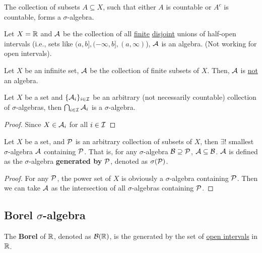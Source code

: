 \documentclass[11pt]{article}
\begin{document}
	\begin{example}
		The collection of subsets $A \subseteq X$, such that either $A$ is countable or $A^c$ is countable, forms a $\sigma$-algebra.
	\end{example}
	
	\begin{example}
		Let $X = \mathbb{R}$ and $\mathcal{{A}}$ be the collection of all \ul{finite} \ul{disjoint} unions of half-open intervals (i.e., sets like $(a, b], (-\infty, b], (a, \infty)$), $\mathcal{{A}}$ is an algebra. (Not working for open intervals).
	\end{example}
	
	\begin{example}
		Let $X$ be an infinite set, $\mathcal{{A}}$ be the collection of finite subsets of $X$. Then, $\mathcal{{A}}$ is \ul{not} an algebra.
	\end{example}
	
	\begin{proposition}
		Let $X$ be a set and $\{\mathcal{{A}}_i\}_{i \in \mathcal{{I}}}$ be an arbitrary (not necessarily countable) collection of $\sigma$-algebras, then $\bigcap_{i \in \mathcal{{I}}} \mathcal{{A}}_i$ is a $\sigma$-algebra.
		\begin{proof}
			Since $X \in \mathcal{{A}}_i$ for all $i \in \mathcal{{I}}$
		\end{proof}
	\end{proposition}
	
	\begin{corollary}
		Let $X$ be a set, and $\mathcal{{P}}$ is an arbitrary collection of subsets of $X$, then $\exists !$ smallest $\sigma$-algebra $\mathcal{{A}}$ containing $\mathcal{{P}}$. That is, for any $\sigma$-algebra $\mathcal{{B}} \supseteq \mathcal{{P}}$, $\mathcal{{A}} \subseteq \mathcal{{B}}$. $\mathcal{{A}}$ is defined as the $\sigma$-algebra \textbf{generated by} $\mathcal{{P}}$, denoted as $\sigma(\mathcal{{P}})$.
	\end{corollary}
	
	\begin{proof}
		For any $\mathcal{{P}}$, the power set of $X$ is obviously a $\sigma$-algebra containing $\mathcal{{P}}$. Then we can take $\mathcal{{A}}$ as the intersection of all $\sigma$-algebras containing $\mathcal{{P}}$.
	\end{proof}
	
	\subsection{Borel $\sigma$-algebra}
	\begin{definition}
		The \textbf{Borel \salg} of $\mathbb{R}$, denoted as $\mathcal{{B}}(\mathbb{R})$, is the \salg generated by the set of \ul{open intervals} in $\mathbb{R}$.
	\end{definition}
	
\end{document}
